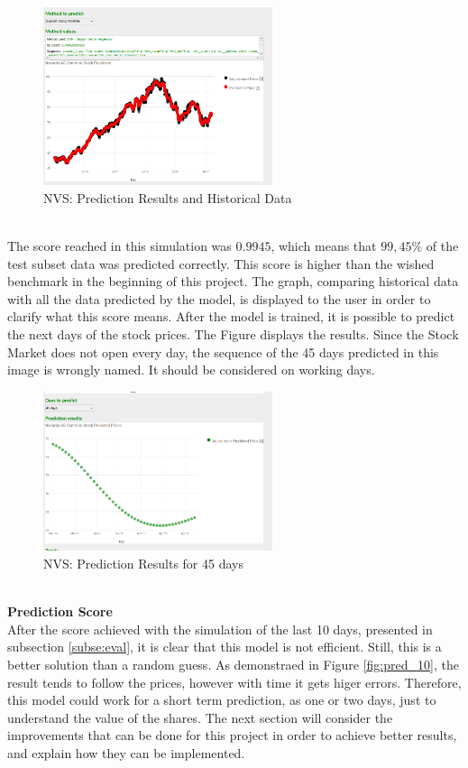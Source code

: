 \begin{figure}[H]
\centering
\includegraphics[width=0.6\textwidth]{figures/predict_svr.png}
\caption{NVS: Prediction Results and Historical Data}
\label{fig:predict_svr}
\end{figure}
\ \\

The score reached in this simulation was $0.9945$, which means that $99,45\%$ of the test subset data was predicted correctly. 
This score is higher than the wished benchmark in the beginning of this project. The graph, comparing historical data with all the data predicted by the model, 
is displayed to the user in order to clarify what this score means. After the model is trained, it is possible to predict the next days of the stock prices. 
The Figure \label{fig:predict_45days} displays the results. Since the Stock Market does not open every day, the sequence of the 45 days predicted in this image is wrongly named. 
It should be considered on working days. 

\begin{figure}[H]
\centering
\includegraphics[width=0.6\textwidth]{figures/predict_45days.png}
\caption{NVS: Prediction Results for 45 days}
\label{fig:predict_45days}
\end{figure}
\ \\

\textbf{Prediction Score}\\
After the score achieved with the simulation of the last 10 days, presented in subsection \ref{subse:eval}, it is clear that this model is not efficient. Still, this is a better
solution than a random guess. As demonstraed in Figure \ref{fig:pred_10}, the result tends to follow the prices, however with time it gets higer errors. Therefore, this model
could work for a short term prediction, as one or two days, just to understand the value of the shares.
The next section will consider the improvements that can be done for this project in order to achieve better results, 
and explain how they can be implemented. \\